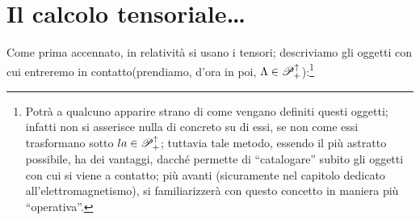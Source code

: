 \section{Il calcolo tensoriale\ldots}
Come prima accennato, in relativit\`a si usano i tensori; descriviamo
gli oggetti con cui entreremo in contatto(prendiamo, d'ora in poi, $\Lambda
\in \mathscr{P}^{\uparrow}_{+}$):\footnote{Potr\`a a qualcuno apparire strano
di come vengano definiti questi oggetti; infatti non si asserisce nulla
di concreto su di essi, se non come essi trasformano sotto $la \in
\mathscr{P}^{\uparrow}_{+}$; tuttavia tale metodo, essendo il pi\`u astratto
possibile, ha dei vantaggi, dacch\'e permette di ``catalogare'' subito
gli oggetti con cui si viene a contatto; pi\`u avanti (sicuramente nel
capitolo dedicato all'elettromagnetismo), si familiarizzer\`a con questo
concetto in maniera pi\`u ``operativa''.}
